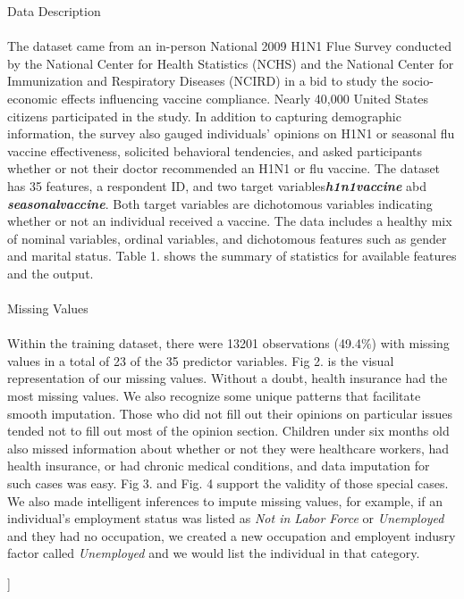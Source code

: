 \documentclass{IEEEtran}
\begin{document}
\begin{@twocolumnfalse}
{\huge Data Description}\\\\
The dataset came from an in-person National 2009 H1N1 Flue Survey conducted by the National Center for Health Statistics (NCHS) and the National Center for Immunization and Respiratory Diseases (NCIRD) in a bid to study the socio-economic effects influencing vaccine compliance. Nearly 40,000 United States citizens participated in the study.  In addition to capturing demographic information, the survey also gauged individuals' opinions on H1N1 or seasonal flu vaccine effectiveness, solicited behavioral tendencies, and asked participants whether or not their doctor recommended an H1N1 or flu vaccine.  The dataset has 35 features, a respondent ID, and two target variables\textemdash \textbf{\emph{h1n1\textunderscore vaccine}} abd \textbf{\emph{seasonal\textunderscore vaccine}}. Both target variables are dichotomous variables indicating whether or not an individual received a vaccine. The data includes a healthy mix of nominal variables, ordinal variables, and dichotomous features such as gender and marital status.  Table 1. shows the summary of statistics for available features and the output.\\\\
{\huge Missing Values}\\\\ 
Within the training dataset, there were 13201 observations (49.4$\%$) with missing values in a total of 23 of the 35 predictor variables. Fig 2. is the visual representation of our missing values. Without a doubt, health insurance had the most missing values. We also recognize some unique patterns that facilitate smooth imputation. Those who did not fill out their opinions on particular issues tended not to fill out most of the opinion section. Children under six months old also missed information about whether or not they were healthcare workers, had health insurance, or had chronic medical conditions, and data imputation for such cases was easy. Fig 3. and Fig. 4 support the validity of those special cases. We also made intelligent inferences to impute missing values, for example, if an individual's employment status was listed as \emph{Not in Labor Force} or \emph{Unemployed} and they had no occupation, we created a new occupation and employent indusry factor called \emph{Unemployed} and we would list the individual in that category.
\end{@twocolumnfalse}
]
\end{document}
